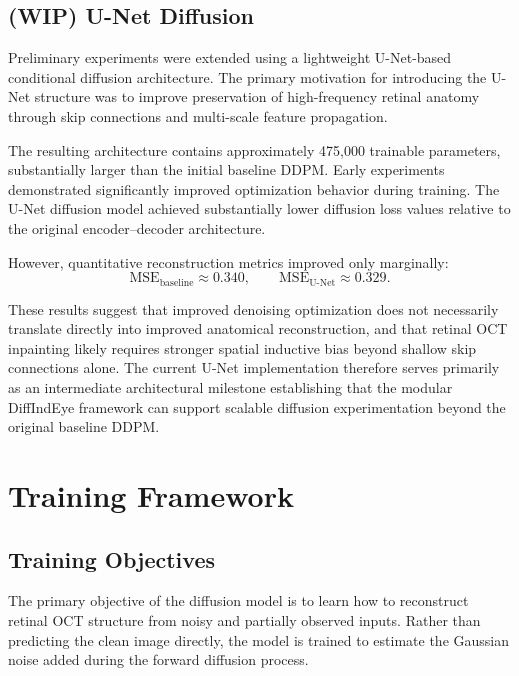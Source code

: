 \documentclass[12pt,oneside]{article}
\begin{document}
\subsection{(WIP) U-Net Diffusion}

Preliminary experiments were extended using a lightweight U-Net-based conditional diffusion architecture. The primary motivation for introducing the U-Net structure was to improve preservation of high-frequency retinal anatomy through skip connections and multi-scale feature propagation.

The resulting architecture contains approximately 475,000 trainable parameters, substantially larger than the initial baseline DDPM.
Early experiments demonstrated significantly improved optimization behavior during training. The U-Net diffusion model achieved substantially lower diffusion loss values relative to the original encoder--decoder architecture.

However, quantitative reconstruction metrics improved only marginally:
\[
\mathrm{MSE}_{\mathrm{baseline}}
\approx
0.340,
\qquad
\mathrm{MSE}_{\mathrm{U\text{-}Net}}
\approx
0.329.
\]

These results suggest that improved denoising optimization does not necessarily translate directly into improved anatomical reconstruction, and that retinal OCT inpainting likely requires stronger spatial inductive bias beyond shallow skip connections alone.
The current U-Net implementation therefore serves primarily as an intermediate architectural milestone establishing that the modular DiffIndEye framework can support scalable diffusion experimentation beyond the original baseline DDPM.

\section{Training Framework}

\subsection*{Training Objectives}

The primary objective of the diffusion model is to learn how to reconstruct retinal OCT structure from noisy and partially observed inputs. Rather than predicting the clean image directly, the model is trained to estimate the Gaussian noise added during the forward diffusion process.
\end{document}
